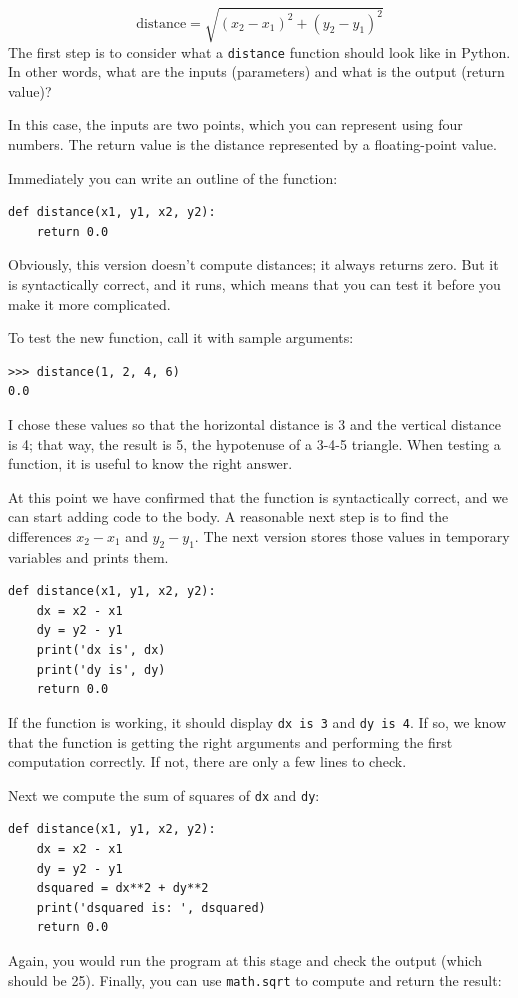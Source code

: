 \documentclass[10pt]{book}
\begin{document}
\begin{displaymath}
\mathrm{distance} = \sqrt{(x_2 - x_1)^2 + (y_2 - y_1)^2}
\end{displaymath}
%
The first step is to consider what a {\tt distance} function should
look like in Python.  In other words, what are the inputs (parameters)
and what is the output (return value)?

In this case, the inputs are two points, which you can represent
using four numbers.  The return value is the distance represented by
a floating-point value.

Immediately you can write an outline of the function:

\begin{verbatim}
def distance(x1, y1, x2, y2):
    return 0.0
\end{verbatim}
%
Obviously, this version doesn't compute distances; it always returns
zero.  But it is syntactically correct, and it runs, which means that
you can test it before you make it more complicated.

To test the new function, call it with sample arguments:

\begin{verbatim}
>>> distance(1, 2, 4, 6)
0.0
\end{verbatim}
%
I chose these values so that the horizontal distance is 3 and the
vertical distance is 4; that way, the result is 5, the hypotenuse
of a 3-4-5 triangle. When testing a function, it is
useful to know the right answer.

At this point we have confirmed that the function is syntactically
correct, and we can start adding code to the body.
A reasonable next step is to find the differences
$x_2 - x_1$ and $y_2 - y_1$.  The next version stores those values in
temporary variables and prints them.

\begin{verbatim}
def distance(x1, y1, x2, y2):
    dx = x2 - x1
    dy = y2 - y1
    print('dx is', dx)
    print('dy is', dy)
    return 0.0
\end{verbatim}
%
If the function is working, it should display \verb"dx is 3" and
\verb"dy is 4".  If so, we know that the function is getting the right
arguments and performing the first computation correctly.  If not,
there are only a few lines to check.

Next we compute the sum of squares of {\tt dx} and {\tt dy}:

\begin{verbatim}
def distance(x1, y1, x2, y2):
    dx = x2 - x1
    dy = y2 - y1
    dsquared = dx**2 + dy**2
    print('dsquared is: ', dsquared)
    return 0.0
\end{verbatim}
%
Again, you would run the program at this stage and check the output
(which should be 25).
Finally, you can use {\tt math.sqrt} to compute and return the result:
\end{document}
